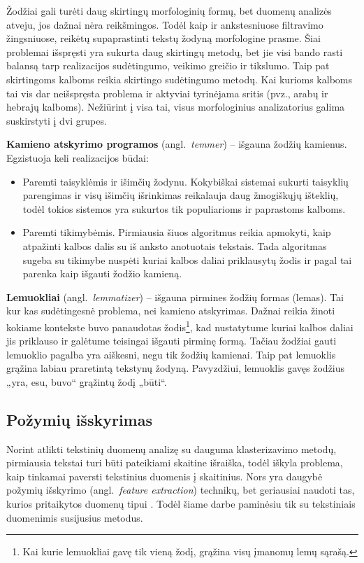 \documentclass{VUMIFInfKursinis}
\newcommand{\ltang}[2]{#1 (angl.\  \textit{#2}) }
\begin{document}
Žodžiai gali turėti daug skirtingų morfologinių formų, bet duomenų
analizės atveju, jos dažnai nėra reikšmingos. Todėl kaip ir
ankstesniuose filtravimo žingsniuose, reikėtų supaprastinti tekstų
žodyną morfologine prasme. Šiai problemai išspręsti yra sukurta daug
skirtingų metodų, bet jie visi bando rasti balansą tarp realizacijos
sudėtingumo, veikimo greičio ir tikslumo. Taip pat skirtingoms kalboms
reikia skirtingo sudėtingumo metodų. Kai kurioms kalboms tai vis dar
neišspręsta problema ir aktyviai tyrinėjama sritis (pvz., arabų ir
hebrajų kalboms). Nežiūrint į visa tai, visus morfologinius
analizatorius galima suskirstyti į dvi grupes.

\ltang{\textbf{Kamieno atskyrimo programos}}{temmer} – išgauna
žodžių kamienus. Egzistuoja keli realizacijos būdai:

\begin{itemize}
\item
  Paremti taisyklėmis ir išimčių žodynu. Kokybiškai sistemai sukurti
  taisyklių parengimas ir visų išimčių išrinkimas reikalauja daug
  žmogiškųjų išteklių, todėl tokios sistemos yra sukurtos tik
  populiarioms ir paprastoms kalboms. 
\item
  Paremti tikimybėmis. Pirmiausia šiuos algoritmus reikia apmokyti, kaip
  atpažinti kalbos dalis su iš anksto anotuotais tekstais. Tada
  algoritmas sugeba su tikimybe nuspėti kuriai kalbos daliai priklausytų
  žodis ir pagal tai parenka kaip išgauti žodžio kamieną.
\end{itemize}

\ltang{\textbf{Lemuokliai}}{lemmatizer} – išgauna pirmines žodžių
formas (lemas). Tai kur kas sudėtingesnė problema, nei kamieno
atskyrimas. Dažnai reikia žinoti kokiame kontekste buvo panaudotas
žodis\footnote{Kai kurie lemuokliai gavę tik vieną žodį, grąžina visų
  įmanomų lemų sąrašą.}, kad nustatytume kuriai kalbos daliai jis
priklauso ir galėtume teisingai išgauti pirminę formą. Tačiau žodžiai
gauti lemuoklio pagalba yra aiškesni, negu tik žodžių kamienai. Taip pat
lemuoklis grąžina labiau praretintą tekstynų žodyną. Pavyzdžiui,
lemuoklis gavęs žodžius „yra, esu, buvo“ grąžintų žodį „būti“.





\subsection{Požymių išskyrimas}\label{pozIs}

Norint atlikti tekstinių duomenų analizę su dauguma klasterizavimo
metodų, pirmiausia tekstai turi būti pateikiami skaitine išraiška, todėl
iškyla problema, kaip tinkamai paversti tekstinius duomenis į
skaitinius. Nors yra daugybė \ltang{požymių išskyrimo}{feature extraction}
technikų, bet geriausiai naudoti tas, kurios pritaikytos
duomenų tipui \cite{alelyani2013feature}. Todėl šiame darbe paminėsiu tik su tekstiniais duomenimis
susijusius metodus.
\end{document}
